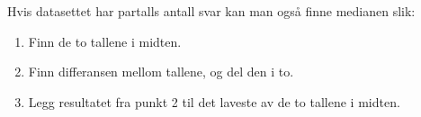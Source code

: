 



\opgt
\nes

Hvis datasettet har partalls antall svar kan man også finne medianen slik:
\begin{enumerate}
	\item Finn de to tallene i midten.
	\item Finn differansen mellom tallene, og del den i to.
	\item Legg resultatet fra punkt 2 til det laveste av de to tallene i midten.
\end{enumerate}



